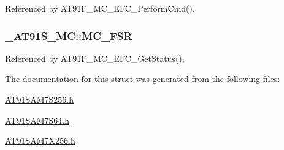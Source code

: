 Referenced by AT91F\_\-MC\_\-EFC\_\-PerformCmd().\hypertarget{struct__AT91S__MC_b2884bb7b1cbca9125cde189992a6ea7}{
\subsubsection{ {\bf \_\-AT91S\_\-MC::MC\_\-FSR}}}
\label{struct__AT91S__MC_b2884bb7b1cbca9125cde189992a6ea7}




Referenced by AT91F\_\-MC\_\-EFC\_\-GetStatus().

The documentation for this struct was generated from the following files:\begin{CompactItemize}
\item 
\hyperlink{AT91SAM7S256_8h}{AT91SAM7S256.h}\item 
\hyperlink{AT91SAM7S64_8h}{AT91SAM7S64.h}\item 
\hyperlink{AT91SAM7X256_8h}{AT91SAM7X256.h}\end{CompactItemize}
